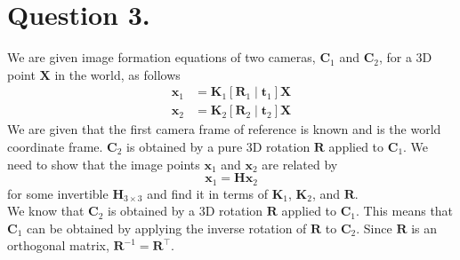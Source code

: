 \documentclass[10pt]{article}
\begin{document}
    \section*{\textbf{Question 3.}}
    We are given image formation equations of two cameras, $\mathbf{C}_{1}$ and
    $\mathbf{C}_{2}$, for a 3D point $\mathbf{X}$ in the world, as follows
    \begin{align*}
        \mathbf{x}_{1} &= \mathbf{K}_{1} \left[ \mathbf{R}_{1} \mid \mathbf{t}_{1} \right] \mathbf{X} \\
        \mathbf{x}_{2} &= \mathbf{K}_{2} \left[ \mathbf{R}_{2} \mid \mathbf{t}_{2} \right] \mathbf{X}
    \end{align*}
    We are given that the first camera frame of reference is known and is the world
    coordinate frame. $\mathbf{C}_{2}$ is obtained by a pure 3D rotation $\mathbf{R}$
    applied to $\mathbf{C}_{1}$. We need to show that the image points $\mathbf{x}_{1}$
    and $\mathbf{x}_{2}$ are related by
    \begin{equation*}
        \mathbf{x}_{1} = \mathbf{H} \mathbf{x}_{2}
    \end{equation*}
    for some invertible $\mathbf{H}_{3 \times 3}$ and find it in terms of $\mathbf{K}_{1}$,
    $\mathbf{K}_{2}$, and $\mathbf{R}$. \\
    We know that $\mathbf{C}_{2}$ is obtained by a 3D rotation $\mathbf{R}$ applied to
    $\mathbf{C}_{1}$. This means that $\mathbf{C}_{1}$ can be obtained by applying the
    inverse rotation of $\mathbf{R}$ to $\mathbf{C}_{2}$. Since $\mathbf{R}$ is an orthogonal
    matrix, $\mathbf{R}^{-1} = \mathbf{R}^{\top}$.
\end{document}
